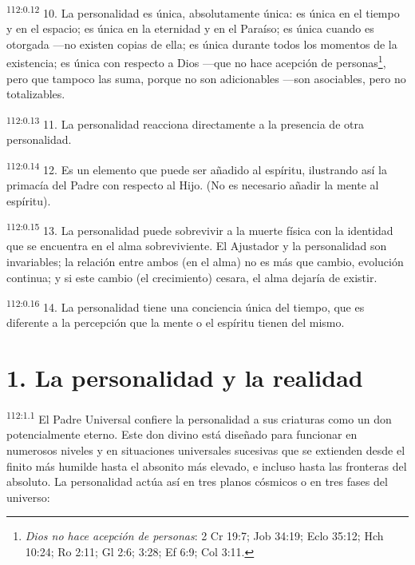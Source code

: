 \documentclass[twoside, 11pt]{book}
\begin{document}
\par
\textsuperscript{112:0.12} 10. La personalidad es única, absolutamente única: es única en el tiempo y en el espacio; es única en la eternidad y en el Paraíso; es única cuando es otorgada ---no existen copias de ella; es única durante todos los momentos de la existencia; es única con respecto a Dios ---que no hace acepción de personas\footnote{\textit{Dios no hace acepción de personas}: 2 Cr 19:7; Job 34:19; Eclo 35:12; Hch 10:24; Ro 2:11; Gl 2:6; 3:28; Ef 6:9; Col 3:11.}, pero que tampoco las suma, porque no son adicionables ---son asociables, pero no totalizables.

\par
\textsuperscript{112:0.13} 11. La personalidad reacciona directamente a la presencia de otra personalidad.

\par
\textsuperscript{112:0.14} 12. Es un elemento que puede ser añadido al espíritu, ilustrando así la primacía del Padre con respecto al Hijo. (No es necesario añadir la mente al espíritu).

\par
\textsuperscript{112:0.15} 13. La personalidad puede sobrevivir a la muerte física con la identidad que se encuentra en el alma sobreviviente. El Ajustador y la personalidad son invariables; la relación entre ambos (en el alma) no es más que cambio, evolución continua; y si este cambio (el crecimiento) cesara, el alma dejaría de existir.

\par
\textsuperscript{112:0.16} 14. La personalidad tiene una conciencia única del tiempo, que es diferente a la percepción que la mente o el espíritu tienen del mismo.

\section*{1. La personalidad y la realidad}
\par
\textsuperscript{112:1.1} El Padre Universal confiere la personalidad a sus criaturas como un don potencialmente eterno. Este don divino está diseñado para funcionar en numerosos niveles y en situaciones universales sucesivas que se extienden desde el finito más humilde hasta el absonito más elevado, e incluso hasta las fronteras del absoluto. La personalidad actúa así en tres planos cósmicos o en tres fases del universo:
\end{document}
